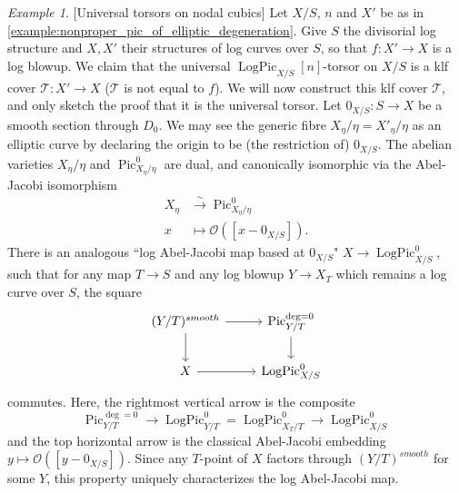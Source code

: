 \documentclass[a4paper,11pt]{amsart} %
\numberwithin{equation}{subsection}
\newcommand{\on}[1]{\operatorname{#1}}
\newcommand{\ca}[1]{{\mathcal{#1}}}
\newcommand{\lra}{\longrightarrow}
\newcommand{\iso}{\stackrel{\sim}{\lra}}
\theoremstyle{definition}
\theoremstyle{plain}%
\theoremstyle{remark}
\newtheorem{example}[definition]{Example}
\begin{document}
\begin{example}\label{example:univ_torsor_on_nodal_cubic}[Universal torsors on nodal cubics]
    Let $X/S$, $n$ and $X'$ be as in \ref{example:nonproper_pic_of_elliptic_degeneration}. Give $S$ the divisorial log structure and $X,X'$ their structures of log curves over $S$, so that $f \colon X' \to X$ is a log blowup. We claim that the universal $\on{LogPic}_{X/S}[n]$-torsor on $X/S$ is a klf cover $\ca T \colon X' \to X$ ($\ca T$ is not equal to $f$). We will now construct this klf cover $\ca T$, and only sketch the proof that it is the universal torsor. Let $0_{X/S} \colon S \to X$ be a smooth section through $D_0$. We may see the generic fibre $X_\eta/\eta=X'_\eta/\eta$ as an elliptic curve by declaring the origin to be (the restriction of) $0_{X/S}$. The abelian varieties $X_\eta/\eta$ and $\on{Pic}^0_{X_\eta/\eta}$ are dual, and canonically isomorphic via the Abel-Jacobi isomorphism
\begin{align*}
   X_\eta & \iso \on{Pic}^0_{X_\eta/\eta} \\
   x & \mapsto \ca O([x-0_{X/S}]).
\end{align*}
There is an analogous ``log Abel-Jacobi map based at $0_{X/S}$" $X \to \on{LogPic}^0_{X/S}$, such that for any map $T \to S$ and any log blowup $Y \to X_T$ which remains a log curve over $S$, the square
\[
\begin{tikzcd}
    (Y/T)^{smooth} \arrow[r] \arrow[d] & \on{Pic}_{Y/T}^{\deg=0} \arrow[d] \\
    X \arrow[r] & \on{LogPic}^0_{X/S}
\end{tikzcd}
\]
commutes. Here, the rightmost vertical arrow is the composite
\[
\on{Pic}_{Y/T}^{\deg=0} \to \on{LogPic}^0_{Y/T} = \on{LogPic}^0_{X_T/T} \to \on{LogPic}^0_{X/S}
\]
and the top horizontal arrow is the classical Abel-Jacobi embedding $y \mapsto \ca O([y-0_{X/S}])$. Since any $T$-point of $X$ factors through $(Y/T)^{smooth}$ for some $Y$, this property uniquely characterizes the log Abel-Jacobi map.


\end{example}
\end{document}
